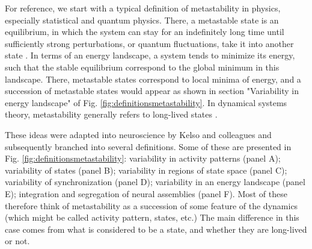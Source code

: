\documentclass[reprint,onecolumn,superscriptaddress,showpacs,amsmath,amssymb,aps,floatfix]{revtex4-2}
\theoremstyle{definition}
\begin{document}
For reference, we start with a typical definition of metastability in physics, especially statistical and quantum physics. There, a metastable state is an equilibrium, in which the system can stay for an indefinitely long time until sufficiently strong perturbations, or quantum fluctuations, take it into another state \cite{olivieri2005large, bovier2009metastability, makela1997metastable}. In terms of an energy landscape, a system tends to minimize its energy, such that the stable equilibrium correspond to the global minimum in this landscape. There, metastable states correspond to local minima of energy, and a succession of metastable states would appear as shown in section "Variability in energy landscape" of Fig. \ref{fig:definitionsmetastability}. In dynamical systems theory, metastability generally refers to long-lived states \cite{yorke1979metastable, bittracher2018transition}.


These ideas were adapted into neuroscience by Kelso and colleagues \cite{kelso1991an} and subsequently branched into several definitions. Some of these are presented in Fig. \ref{fig:definitionsmetastability}: variability in activity patterns \cite{friston1997transients, friston2000transients, varela2001brainweb, roberts2019metastable} (panel A); variability of states \cite{mazzucato2015dynamics, lacamera2019cortical, afraimovich2010longrange, alderson2020metastable, lee2017linking, vasa2015effects, hellyer2014control, naik2017metastability, rabinovich2008transientcognitive, cavanna2018dynamic, werner2007metastability, bhowmik2013metastability} (panel B); variability in regions of state space \cite{hudson2017metastability, graben2019metastable} (panel C); variability of synchronization \cite{cabral2011role, deco2017dynamics, deco2016metastability, poncealvarez2015restingstate, aguilera2016extended} (panel D); variability in an energy landscape \cite{gili2018metastable, cavanna2018dynamic, aguilera2016extended} (panel E); integration and segregation of neural assemblies \cite{deco2015rethinking, fingelkurts2001operational, tognoli2014metastable, tognoli2014enlarging, bressler2016coordination, kelso2012multistability, hellyer2015cognitive} (panel F). Most of these therefore think of metastability as a succession of some feature of the dynamics (which might be called activity pattern, states, etc.) The main difference in this case comes from what is considered to be a state, and whether they are long-lived or not. 
\end{document}
